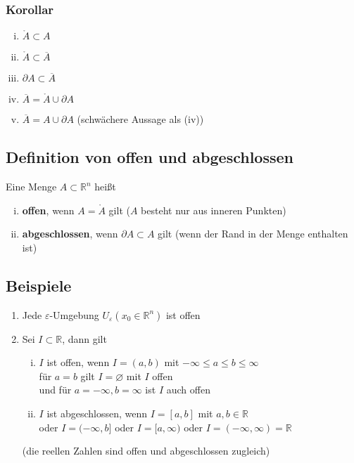 \documentclass[11pt,a4paper]{book}
\newcommand {\R}	{\mathbb{R}}
\newcommand {\Rn}	{\mathbb{R}^n}
\newcommand{\1}    	{\mathbbm{1}}
\begin{document}
\subsubsection*{Korollar}
\begin{enumerate}[(i)]
	\item \(\mathring{A} \subset A\)
	\item \(\mathring{A} \subset \overline{A}\)
	\item \(\partial A \subset \overline{A}\)
	\item \(\overline{A} = \mathring{A} \cup \partial A \)
	\item \(\overline{A} = A \cup \partial A \) (schwächere Aussage als (iv))
\end{enumerate}

\subsection{Definition von offen und abgeschlossen}
Eine Menge \(A \subset \Rn\) heißt
\begin{enumerate}[(i)]
	\item \textbf{offen}, wenn \(A = \mathring{A} \) gilt (\(A\) besteht nur aus inneren Punkten)
	\item \textbf{abgeschlossen}, wenn \(\partial A \subset A \) gilt (wenn der Rand in der Menge enthalten ist)
\end{enumerate}

\subsection{Beispiele}
\begin{enumerate}[1.~]
	\item Jede \(\varepsilon\)-Umgebung \(U_\varepsilon(x_0 \in \Rn)\) ist offen
	\item Sei \(I \subset \R\), dann gilt
	\begin{enumerate}[(i)]
		\item \(I\) ist offen, wenn \(I = (a,b)\) mit \( -\infty \leqslant a \leqslant b \leqslant \infty \) \\
		für \(a = b\) gilt \(I = \varnothing\) mit \(I\) offen \\
		und für \(a = -\infty, b = \infty\) ist \(I\) auch offen
		\item \(I\) ist abgeschlossen, wenn \(I = [a,b]\) mit \(a,b \in \R\) \\
		oder \(I = (-\infty, b]\) oder \(I = [a, \infty) \) oder \(I = (-\infty, \infty) = \R\)
	\end{enumerate}
	(die reellen Zahlen sind offen und abgeschlossen zugleich)
\end{enumerate}
\end{document}
